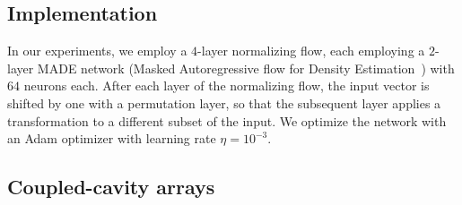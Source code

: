 \documentclass[10pt]{iopart}  %
\begin{document}
\subsection{Implementation}
In our experiments, we employ a $4$-layer normalizing flow, each employing a $2$-layer MADE network (Masked Autoregressive flow for Density Estimation~\cite{papamakarios_masked_2017}) with $64$ neurons each.
After each layer of the normalizing flow, the input vector is shifted by one with a permutation layer, so that the subsequent layer applies a transformation to a different subset of the input.
We optimize the network with an Adam optimizer with learning rate $\eta=10^{-3}$.

\subsection{Coupled-cavity arrays}
\end{document}
